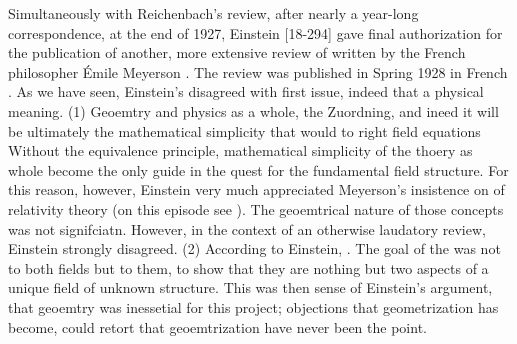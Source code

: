 \documentclass[draft]{article}
\begin{document}
Simultaneously with Reichenbach's review, after nearly a year-long correspondence, at the end of 1927, Einstein [18-294] gave final authorization for the publication of another, more extensive review of  written by the French philosopher \'Emile Meyerson \citep{Meyerson1925}. The review was published in Spring 1928 in French \citep{Einstein1928b}. As we have seen, Einstein's disagreed with first issue, indeed that a physical meaning. (1) Geoemtry and physics as a whole, the Zuordning, and ineed it will be ultimately the mathematical simplicity that would to right field equations Without the equivalence principle, mathematical simplicity of the thoery as whole become the only guide in the quest for the fundamental field structure. For this reason, however, Einstein very much appreciated Meyerson's insistence on  of relativity theory (on this episode see ). The geoemtrical nature of those concepts was not signifciatn. However, in the context of an otherwise laudatory review, Einstein strongly disagreed. (2) According to Einstein,  \citep[165\me]{Einstein1928b}. The goal of the \uftp was not to  both fields but to  them, to show that they are nothing but two aspects of a unique  field of unknown structure. This was then sense of Einstein's argument, that geoemtry was inessetial for this project; objections that geometrization has become, could retort that geoemtrization have never been the point.


\end{document}
